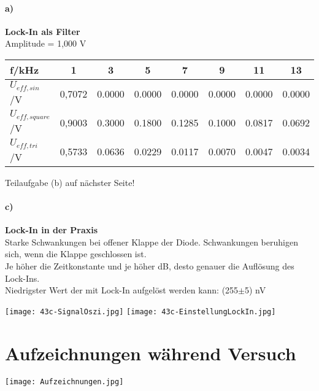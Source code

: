\paragraph{a)}\textbf{Lock-In als Filter}\\
Amplitude = 1,000 V
\begin{center}
    \begin{tabular}{l | c c c c c c c}
        f/kHz               & 1 & 3 & 5 & 7 & 9 & 11 & 13 \\
        \hline
        $U_{eff,sin}$/V     & 0,7072 & 0.0000 & 0.0000 & 0.0000 & 0.0000 & 0.0000 & 0.0000 \\
        $U_{eff,square}$/V  & 0,9003 & 0.3000 & 0.1800 & 0.1285 & 0.1000 & 0.0817 & 0.0692 \\
        $U_{eff,tri}$/V     & 0,5733 & 0.0636 & 0.0229 & 0.0117 & 0.0070 & 0.0047 & 0.0034 \\
    \end{tabular}
\end{center}
Teilaufgabe (b) auf nächster Seite!
\paragraph{c)}\textbf{Lock-In in der Praxis}\\
Starke Schwankungen bei offener Klappe der Diode. Schwankungen beruhigen sich, wenn die Klappe geschlossen ist.\\
Je höher die Zeitkonstante und je höher dB, desto genauer die Auflösung des Lock-Ins.\\
Niedrigster Wert der mit Lock-In aufgelöst werden kann: (255$\pm$5) nV
\begin{center}
    \texttt{[image: 43c-SignalOszi.jpg]}
    \label{image:oszi}
    \texttt{[image: 43c-EinstellungLockIn.jpg]}
    \label{image:lockIn}
\end{center}
\section*{Aufzeichnungen während Versuch}
\begin{center}
    \texttt{[image: Aufzeichnungen.jpg]}
    \label{image:aufzeichnungen}
\end{center}
\newpage
